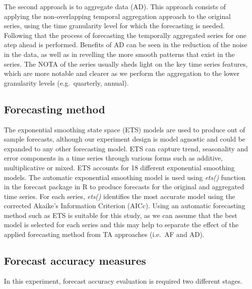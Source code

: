\documentclass[preprint, 3p,
authoryear]{elsarticle} %
\begin{document}
The second approach is to aggregate data (AD). This approach consists of
applying the non-overlapping temporal aggregation approach to the
original series, using the time granularity level for which the
forecasting is needed. Following that the process of forecasting the
temporally aggregated series for one atep ahead is performed. Benefits
of AD can be seen in the reduction of the noise in the data, as well as
in revelling the more smooth patterns that exist in the series. The NOTA
of the series usually sheds light on the key time series features, which
are more notable and clearer as we perform the aggregation to the lower
granularity levels (e.g.~quarterly, annual).

\hypertarget{forecasting-method}{%
\subsection{Forecasting method}\label{forecasting-method}}

The exponential smoothing state space (ETS) models
\citep{hyndman2021forecasting} are used to produce out of sample
forecasts, although our experiment design is model agnostic and could be
expanded to any other forecasting model. ETS can capture trend,
seasonality and error components in a time series through various forms
such as additive, multiplicative or mixed. ETS accounts for 18 different
exponential smoothing models. The automatic exponential smoothing model
is used using \emph{ets()} function in the forecast package
\citep{hyndman2008automatic} in R to produce forecasts for the original
and aggregated time series. For each series, \emph{ets()} identifies the
most accurate model using the corrected Akaike's Information Criterion
(AICc). Using an automatic forecasting method such as ETS is suitable
for this study, as we can assume that the best model is selected for
each series and this may help to separate the effect of the applied
forecasting method from TA approaches (i.e.~AF and AD).

\hypertarget{errormetric}{%
\subsection{Forecast accuracy measures}\label{errormetric}}

In this experiment, forecast accuracy evaluation is required two
different stages.
\end{document}
